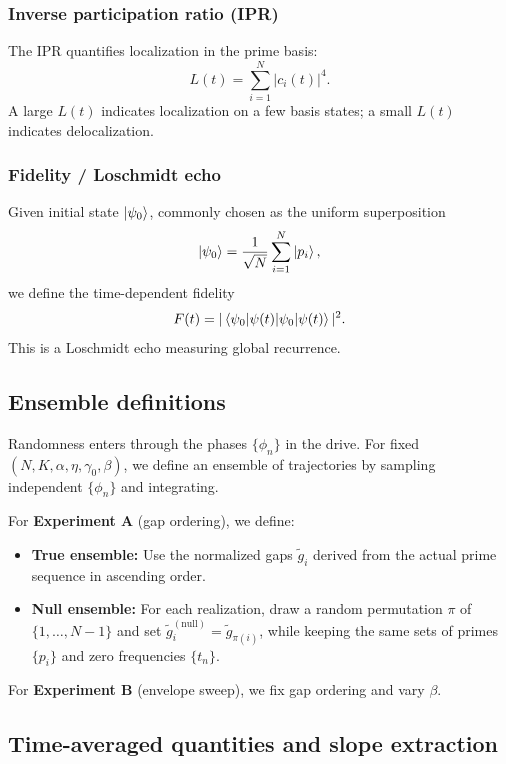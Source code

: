 \documentclass[11pt]{article}
\begin{document}
\subsubsection{Inverse participation ratio (IPR)}

The IPR quantifies localization in the prime basis:
\begin{equation}
  L(t) = \sum_{i=1}^N |c_i(t)|^4.
\end{equation}
A large $L(t)$ indicates localization on a few basis states; a small $L(t)$ indicates delocalization.

\subsubsection{Fidelity / Loschmidt echo}

Given initial state $\ket{\psi_0}$, commonly chosen as the uniform superposition
\[
\ket{\psi_0} = \frac{1}{\sqrt{N}}\sum_{i=1}^N \ket{p_i},
\]
we define the time-dependent fidelity
\begin{equation}
  F(t) = |\braket{\psi_0|\psi(t)}|^2.
\end{equation}
This is a Loschmidt echo measuring global recurrence.

\subsection{Ensemble definitions}

Randomness enters through the phases $\{\phi_n\}$ in the drive. For fixed $(N,K,\alpha,\eta,\gamma_0,\beta)$, we define an ensemble of trajectories by sampling independent $\{\phi_n\}$ and integrating.

For \textbf{Experiment A} (gap ordering), we define:

\begin{itemize}
  \item \textbf{True ensemble:} Use the normalized gaps $\tilde g_i$ derived from the actual prime sequence in ascending order.
  \item \textbf{Null ensemble:} For each realization, draw a random permutation $\pi$ of $\{1,\dots,N-1\}$ and set $\tilde g_i^{(\text{null})} = \tilde g_{\pi(i)}$, while keeping the same sets of primes $\{p_i\}$ and zero frequencies $\{t_n\}$.
\end{itemize}

For \textbf{Experiment B} (envelope sweep), we fix gap ordering and vary $\beta$.

\subsection{Time-averaged quantities and slope extraction}
\end{document}
